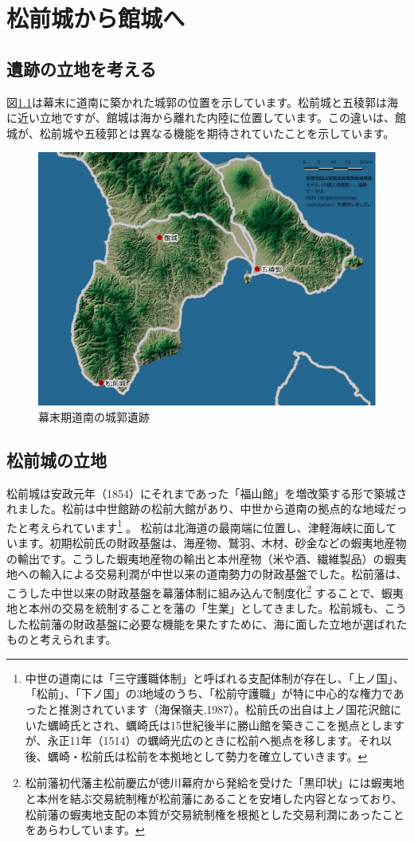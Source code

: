 \documentclass[11pt,report]{jsbook}
\begin{document}
\newpage
\chapter{松前城から館城へ}
\section{遺跡の立地を考える}
図\ref{fig01}は幕末に道南に築かれた城郭の位置を示しています。松前城と五稜郭は海に近い立地ですが、館城は海から離れた内陸に位置しています。この違いは、館城が、松前城や五稜郭とは異なる機能を期待されていたことを示しています。

\begin{figure}[h]
\centering
\includegraphics[width=160truemm]{fig/01map.pdf}
\caption{幕末期道南の城郭遺跡}
\label{fig01}
\end{figure}

\section{松前城の立地}
松前城は安政元年（1854）にそれまであった「福山館」を増改築する形で築城されました。松前は中世館跡の松前大館があり、中世から道南の拠点的な地域だったと考えられています\footnote{
中世の道南には「三守護職体制」と呼ばれる支配体制が存在し、「上ノ国」、「松前」、「下ノ国」の3地域のうち、「松前守護職」が特に中心的な権力であったと推測されています（海保嶺夫,1987）。松前氏の出自は上ノ国花沢館にいた蠣崎氏とされ、蠣崎氏は15世紀後半に勝山館を築きここを拠点としますが、永正11年（1514）の蠣崎光広のときに松前へ拠点を移します。それ以後、蠣崎・松前氏は松前を本拠地として勢力を確立していきます。
}
。
松前は北海道の最南端に位置し、津軽海峡に面しています。初期松前氏の財政基盤は、海産物、鷲羽、木材、砂金などの蝦夷地産物の輸出です。こうした蝦夷地産物の輸出と本州産物（米や酒、繊維製品）の蝦夷地への輸入による交易利潤が中世以来の道南勢力の財政基盤でした。松前藩は、こうした中世以来の財政基盤を幕藩体制に組み込んで制度化\footnote{
松前藩初代藩主松前慶広が徳川幕府から発給を受けた「黒印状」には蝦夷地と本州を結ぶ交易統制権が松前藩にあることを安堵した内容となっており、松前藩の蝦夷地支配の本質が交易統制権を根拠とした交易利潤にあったことをあらわしています。
}
することで、蝦夷地と本州の交易を統制することを藩の「生業」としてきました。松前城も、こうした松前藩の財政基盤に必要な機能を果たすために、海に面した立地が選ばれたものと考えられます。
\end{document}
